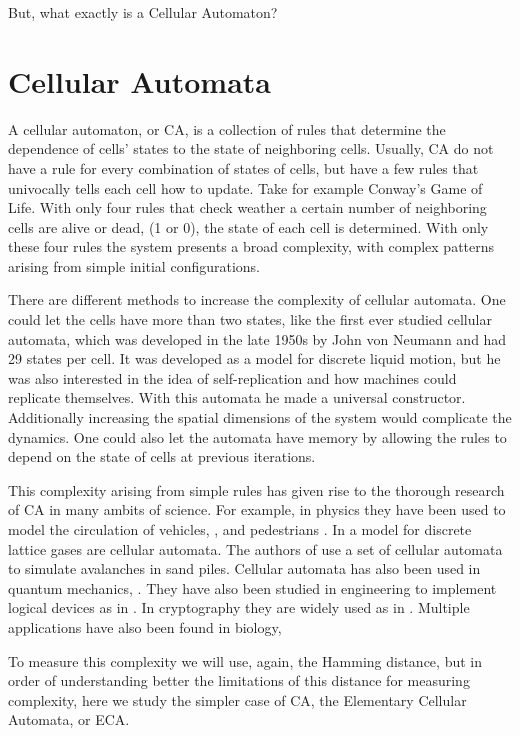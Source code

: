 But, what exactly is a Cellular Automaton?

\section{Cellular Automata}


A cellular automaton, or CA, is a collection of rules that determine the dependence of cells' states to the state of neighboring cells.
Usually, CA do not have a rule for every combination of states of cells, but have a few rules that univocally tells each cell how to update. Take for example Conway's Game of Life. With only four rules that check weather a certain number of neighboring cells are alive or dead, (1 or 0), the state of each cell is determined. With only these four rules the system presents a broad complexity, with complex patterns arising from simple initial configurations. 


There are different methods to increase the complexity of cellular automata. One could let the cells have more than two states, like the first ever studied cellular automata, which was developed in the late 1950s by John von Neumann \cite{VonNeummanCA} and had 29 states per cell. It was developed as a model for discrete liquid motion, but he was also interested in the idea of self-replication and how machines could replicate themselves. With this automata he made a universal constructor. Additionally increasing the spatial dimensions of the system would complicate the dynamics. One could also let the automata have memory by allowing the rules to depend on the state of cells at previous iterations.

This complexity arising from simple rules has given rise to the thorough research of CA in many ambits of science. For example, in physics they have been used to model the circulation of vehicles, \cite{PhysicsCA1}, and pedestrians \cite{PhysicsCA2}. In \cite{PhysicsCA3} a model for discrete lattice gases are cellular automata. The authors of \cite{PhysicsCA4} use a set of cellular automata to simulate avalanches in sand piles. Cellular automata has also been used in quantum mechanics, \cite{PhysicsCA5}. They have also been studied in engineering to implement logical devices as in \cite{EngineeringCA1}. In cryptography they are widely used as in \cite{CryptographyCA1, CryptographyCA2Lya}. Multiple applications have also been found in biology, \cite{BiologyCA1, BiologyCA2, BiologyCA3}


To measure this complexity we will use, again, the Hamming distance, but in order of understanding better the limitations of this distance for measuring complexity, here we study the simpler case of CA, the Elementary Cellular Automata, or ECA. 







